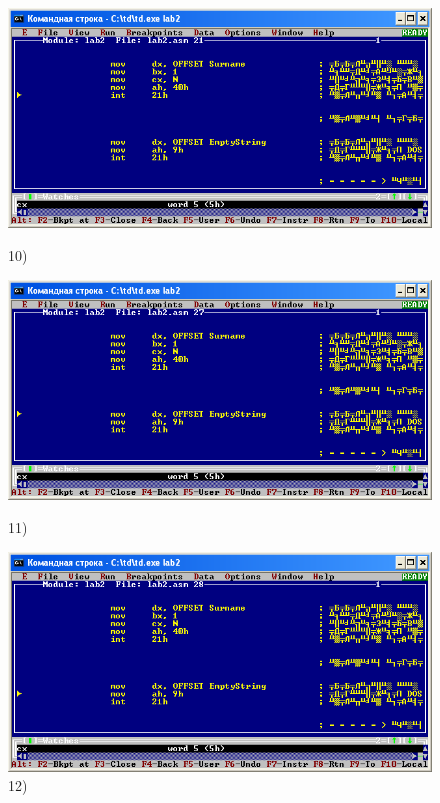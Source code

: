 \begin{figure}[!htp]
    \centering
    \begin{minipage}{0.32\textwidth}
        \centering
        \includegraphics[width=.99\linewidth]
            {../_INCLUDES/task-4-14/10.png}
        \caption{10) }
        \label{fig:task_4_14__10}
    \end{minipage}
    \begin {minipage}{0.32\textwidth}
        \centering
        \includegraphics[width=.99\linewidth]
            {../_INCLUDES/task-4-14/11.png}
        \caption{11) }
        \label{fig:task_4_14__11}
    \end{minipage}
    \begin {minipage}{0.32\textwidth}
        \centering
        \includegraphics[width=.99\linewidth]
            {../_INCLUDES/task-4-14/12.png}
        \caption{12) }
        \label{fig:task_4_14__12}
    \end{minipage}
\end{figure}

